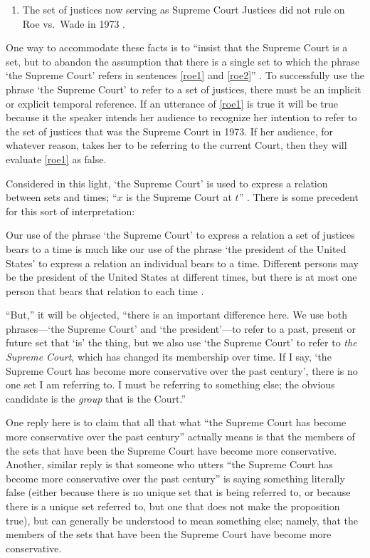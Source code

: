 \documentclass[11pt]{article}
\newenvironment{squote}{%
\begin{spacing}{1}
\begin{list}{}{%
\setlength{\labelwidth}{0pt}%
\rightmargin\leftmargin%
}
\item\relax
}{%
\end{list}%
\end{spacing}
}
\begin{document}
\begin{spacing}{1.5}
\begin{enumerate}[ref=(\arabic*)]
  \item The set of justices now serving as Supreme Court Justices did
    not rule on Roe vs.\ Wade in 1973
    \citep[135]{uzquiano2004a}. \label{roe2}
\end{enumerate}

One way to accommodate these facts is to ``insist that the Supreme
Court is a set, but to abandon the assumption that there is a single
set to which the phrase `the Supreme Court' refers in sentences
\ref{roe1} and \ref{roe2}'' \citep[138]{uzquiano2004a}.  To
successfully use the phrase `the Supreme Court' to refer to a set of
justices, there must be an implicit or explicit temporal reference.
If an utterance of \ref{roe1} is true it will be true because it the
speaker intends her audience to recognize her intention to refer to
the set of justices that was the Supreme Court in 1973.  If her
audience, for whatever reason, takes her to be referring to the
current Court, then they will evaluate \ref{roe1} as false.

Considered in this light, `the Supreme Court' is used to express a
relation between sets and times; ``$x$ is the Supreme Court at $t$''
\citep[140]{uzquiano2004a}.  There is some precedent for this sort of
interpretation:

\begin{squote}
Our use of the phrase `the Supreme Court' to express a relation a set
of justices bears to a time is much like our use of the phrase `the
president of the United States' to express a relation an individual
bears to a time.  Different persons may be the president of the United
States at different times, but there is at most one person that bears
that relation to each time \citep[138]{uzquiano2004a}.
\end{squote}

``But,'' it will be objected, ``there is an important difference here.
We use both phrases---`the Supreme Court' and `the president'---to
refer to a past, present or future set that `is' the thing, but we
also use `the Supreme Court' to refer to {\em the Supreme Court},
which has changed its membership over time.  If I say, `the Supreme
Court has become more conservative over the past century', there is no
one set I am referring to.  I must be referring to something else; the
obvious candidate is the {\em group} that is the Court.''

One reply here is to claim that all that what ``the Supreme Court has
become more conservative over the past century'' actually means is
that the members of the sets that have been the Supreme Court have
become more conservative.  Another, similar reply is that someone who
utters ``the Supreme Court has become more conservative over the past
century'' is saying something literally false (either because there is
no unique set that is being referred to, or because there is a unique
set referred to, but one that does not make the proposition true), but
can generally be understood to mean something else; namely, that the
members of the sets that have been the Supreme Court have become more
conservative.


\end{spacing}
\end{document}
